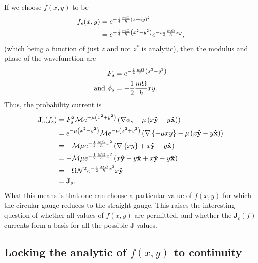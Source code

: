 If we choose $f(x,y)$ to be
\begin{align}
    f_s(x,y) &= e^{- \frac{1}{4} \frac{m \Omega}{\hbar} \left( x + i y \right)^2} \\
             &= e^{- \frac{1}{4} \frac{m \Omega}{\hbar} \left( x^2 - y^2 \right)}
                e^{-i \frac{1}{2} \frac{m \Omega}{\hbar} xy},
\end{align}
(which being a function of just $z$ and not $z^*$ is analytic), then the modulus
and phase of the wavefunction are
\begin{align}
    F_s &= e^{- \frac{1}{4} \frac{m \Omega}{\hbar} \left( x^2 - y^2 \right)} \\
    \mathrm{and}~ \phi_s &= -\frac{1}{2} \frac{m \Omega}{\hbar} xy.
\end{align}
Thus, the probability current is
\begin{align}
    \mathbf{J}_c(f_s)
    &= F_s^2 \mathcal{M} e^{- \mu \left( x^2 + y^2 \right)}
       \left( \nabla \phi_s - \mu \left( x\mathbf{\hat y } -
       y\mathbf{\hat x } \right) \right) \\
    &= e^{- \mu \left( x^2 - y^2 \right)} \mathcal{M} e^{- \mu \left( x^2 + y^2
       \right)} \left( \nabla \left\{ - \mu xy \right\} - \mu \left( x\mathbf{\hat y } - y
       \mathbf{\hat x } \right) \right) \\
    &= - \mathcal{M} \mu e^{- \frac{1}{2} \frac{M
       \Omega}{\hbar} x^2} \left( \nabla \left\{ xy \right\} + x\mathbf{\hat y } -
       y\mathbf{\hat x } \right) \\
    &= - \mathcal{M} \mu e^{- \frac{1}{2} \frac{M
       \Omega}{\hbar} x^2} \left( x\mathbf{\hat y } + y\mathbf{\hat x } + x\mathbf{\hat y } -
       y\mathbf{\hat x } \right) \\
    &= - \Omega \mathcal{N}^2  e^{- \frac{1}{2} \frac{M \Omega}{\hbar} x^2}
       x\mathbf{\hat y } \\
       &= \mathbf{J}_s.
\end{align}
What this means is that one can choose a particular value of $f(x,y)$ for which
the circular gauge reduces to the straight gauge. This raises the interesting
question of whether all values of $f(x,y)$ are permitted, and whether the
$\mathbf{J}_c(f)$ currents form a basis for all the possible $\mathbf{J}$
values.

\subsection{Locking the analytic of $f(x,y)$ to continuity}

